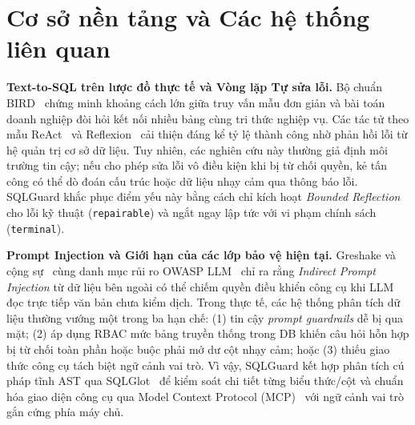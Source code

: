 \section{Cơ sở nền tảng và Các hệ thống liên quan}
\label{sec:background}

\noindent \textbf{Text-to-SQL trên lược đồ thực tế và Vòng lặp Tự sửa lỗi.} Bộ chuẩn BIRD~\cite{li2023bird} chứng minh khoảng cách lớn giữa truy vấn mẫu đơn giản và bài toán doanh nghiệp đòi hỏi kết nối nhiều bảng cùng tri thức nghiệp vụ. Các tác tử theo mẫu ReAct~\cite{yao2023react} và Reflexion~\cite{shinn2023reflexion} cải thiện đáng kể tỷ lệ thành công nhờ phản hồi lỗi từ hệ quản trị cơ sở dữ liệu. Tuy nhiên, các nghiên cứu này thường giả định môi trường tin cậy; nếu cho phép sửa lỗi vô điều kiện khi bị từ chối quyền, kẻ tấn công có thể dò đoán cấu trúc hoặc dữ liệu nhạy cảm qua thông báo lỗi. SQLGuard khắc phục điểm yếu này bằng cách chỉ kích hoạt \textit{Bounded Reflection} cho lỗi kỹ thuật (\texttt{repairable}) và ngắt ngay lập tức với vi phạm chính sách (\texttt{terminal}).

\noindent \textbf{Prompt Injection và Giới hạn của các lớp bảo vệ hiện tại.} Greshake và cộng sự~\cite{greshake2023indirect} cùng danh mục rủi ro OWASP LLM~\cite{owasp2025llm} chỉ ra rằng \textit{Indirect Prompt Injection} từ dữ liệu bên ngoài có thể chiếm quyền điều khiển công cụ khi LLM đọc trực tiếp văn bản chưa kiểm dịch. Trong thực tế, các hệ thống phân tích dữ liệu thường vướng một trong ba hạn chế: (1) tin cậy \textit{prompt guardrails} dễ bị qua mặt; (2) áp dụng RBAC mức bảng truyền thống trong DB khiến câu hỏi hỗn hợp bị từ chối toàn phần hoặc buộc phải mở dư cột nhạy cảm; hoặc (3) thiếu giao thức công cụ tách biệt ngữ cảnh vai trò. Vì vậy, SQLGuard kết hợp phân tích cú pháp tĩnh AST qua SQLGlot~\cite{sqlglot} để kiểm soát chi tiết từng biểu thức/cột và chuẩn hóa giao diện công cụ qua Model Context Protocol (MCP)~\cite{mcp2024} với ngữ cảnh vai trò gắn cứng phía máy chủ.
